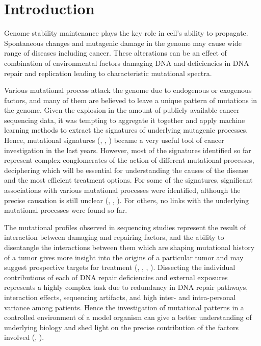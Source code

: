 

\pagestyle{empty}

\chapter{Introduction}

Genome stability maintenance plays the key role in cell’s ability to propagate. Spontaneous 
changes and mutagenic damage in the genome may cause wide range of diseases including cancer. 
These alterations can be an effect of combination of environmental factors damaging DNA and 
deficiencies in DNA repair and replication leading to characteristic mutational spectra.

Various mutational process attack the genome due to endogenous or exogenous factors, and 
many of them are believed to leave a unique pattern of mutations in the genome. Given the 
explosion in the amount of publicly available cancer sequencing data, it was tempting to 
aggregate it together and apply machine learning methods to extract the signatures of 
underlying mutagenic processes. Hence, mutational signatures (\cite{Alexandrov2013-md}, 
\cite{Alexandrov2015-clock}, \cite{Nik-Zainal2012-eg}) became a very useful tool of cancer 
investigation in the last years. However, most of the signatures identified so far represent 
complex conglomerates of the action of different mutational processes, deciphering which will 
be essential for understanding the causes of the disease and the most efficient treatment 
options. For some of the signatures, significant associations with various mutational 
processes were identified, although the precise causation is still unclear (\cite{Alexandrov2013-md},
\cite{Alexandrov2015-clock}, \cite{Helleday2014-kw}). For others, no links with the underlying 
mutational processes were found so far. 

The mutational profiles observed in sequencing studies represent the result of interaction 
between damaging and repairing factors, and the ability to disentangle the interactions 
between them which are shaping mutational history of a tumor gives more insight into the 
origins of a particular tumor and may suggest prospective targets for treatment 
(\cite{Alexandrov2013-zu}, \cite{Alexandrov2015-gastric}, \cite{Hollstein2017-ag}, \cite{Poon2014-review}). 
Dissecting the individual contributions of each of DNA repair deficiencies and external 
exposures represents a highly complex task due to  redundancy in DNA repair pathways, 
interaction effects, sequencing artifacts, and high inter- and intra-personal variance 
among patients. Hence the investigation of mutational patterns in a controlled environment 
of a model organism can give a better understanding of underlying biology and shed light 
on the precise contribution of the factors involved (\cite{Meier2014-aa}, \cite{Segovia2015-cr}).

